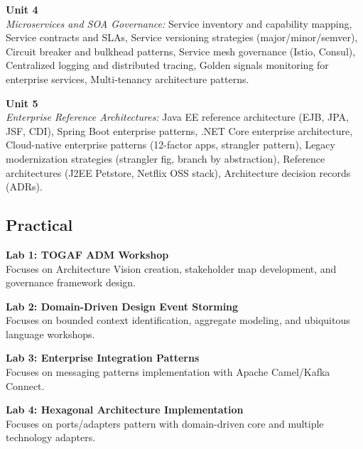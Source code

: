 \noindent\textbf{Unit 4} \\
\textit{Microservices and SOA Governance:} Service inventory and capability mapping, Service contracts and SLAs, Service versioning strategies (major/minor/semver), Circuit breaker and bulkhead patterns, Service mesh governance (Istio, Consul), Centralized logging and distributed tracing, Golden signals monitoring for enterprise services, Multi-tenancy architecture patterns.

\vspace{0.3cm}

\noindent\textbf{Unit 5} \\
\textit{Enterprise Reference Architectures:} Java EE reference architecture (EJB, JPA, JSF, CDI), Spring Boot enterprise patterns, .NET Core enterprise architecture, Cloud-native enterprise patterns (12-factor apps, strangler pattern), Legacy modernization strategies (strangler fig, branch by abstraction), Reference architectures (J2EE Petstore, Netflix OSS stack), Architecture decision records (ADRs).

\newpage

\subsection*{Practical}
\noindent\textbf{Lab 1: TOGAF ADM Workshop} \\
Focuses on Architecture Vision creation, stakeholder map development, and governance framework design.

\vspace{0.2cm}

\noindent\textbf{Lab 2: Domain-Driven Design Event Storming} \\
Focuses on bounded context identification, aggregate modeling, and ubiquitous language workshops.

\vspace{0.2cm}

\noindent\textbf{Lab 3: Enterprise Integration Patterns} \\
Focuses on messaging patterns implementation with Apache Camel/Kafka Connect.

\vspace{0.2cm}

\noindent\textbf{Lab 4: Hexagonal Architecture Implementation} \\
Focuses on ports/adapters pattern with domain-driven core and multiple technology adapters.

\vspace{0.2cm}

